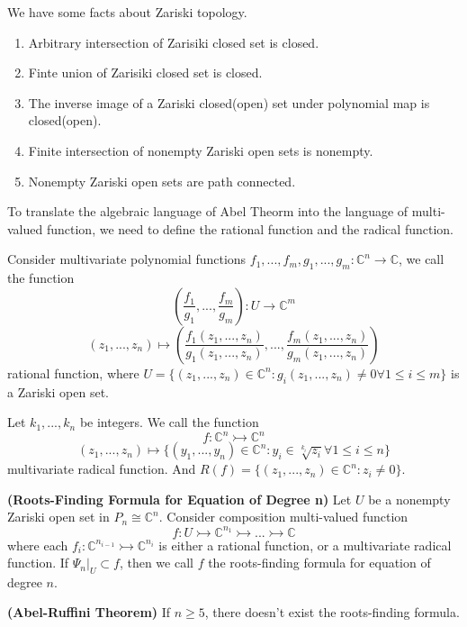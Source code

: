\documentclass[12pt]{article}
\newcommand{\C}{\mathbb{C}}
\newenvironment{definition}[2][Definition]{\begin{trivlist}
\item[\hskip \labelsep {\bfseries #1}\hskip \labelsep {\bfseries #2.}]}{\end{trivlist}}
\newenvironment{theorem}[2][Theorem]{\begin{trivlist}
\item[\hskip \labelsep {\bfseries #1}\hskip \labelsep {\bfseries #2.}]}{\end{trivlist}}
\newenvironment{proposition}[2][Proposition]{\begin{trivlist}
\item[\hskip \labelsep {\bfseries #1}\hskip \labelsep {\bfseries #2.}]}{\end{trivlist}}
\begin{document}
\begin{proposition}{5.2} We have some facts about Zariski topology.
    \begin{enumerate}
    \item Arbitrary intersection of Zarisiki closed set is closed.
    \item Finte union of Zarisiki closed set is closed.
    \item The inverse image of a Zariski closed(open) set under polynomial map is closed(open).
    \item Finite intersection of nonempty Zariski open sets is nonempty.
    \item Nonempty Zariski open sets are path connected.
\end{enumerate}
\end{proposition}
To translate the algebraic language of Abel Theorm into the language of multi-valued function, we need to define the rational function and the radical function.
\begin{definition}{5.3}
    Consider multivariate polynomial functions $f_1,...,f_m,g_1,...,g_m:\C^n\to\C$, we call the function 
    $$
    (\frac{f_1}{g_1},...,\frac{f_m}{g_m}):U\to \C^m
    $$
    $$
    (z_1,...,z_n)\mapsto (\frac{f_1(z_1,...,z_n)}{g_1(z_1,...,z_n)},...,\frac{f_m(z_1,...,z_n)}{g_m(z_1,...,z_n)})
    $$
    rational function, where $U=\{(z_1,...,z_n)\in \C^n:g_i(z_1,...,z_n)\neq 0 \forall 1\leq i\leq m\}$ is a Zariski open set.
\end{definition}
\begin{definition}{5.4}
    Let $k_1,...,k_n$ be integers. We call the function
    $$
    f:\C^n \rightarrowtail \C^n
    $$
    $$
    (z_1,...,z_n)\mapsto\{(y_1,...,y_n)\in \C^n:y_i \in \sqrt[k_i]{z_i}\forall 1\leq i\leq n\}
    $$
    multivariate radical function. And $R(f)=\{(z_1,...,z_n)\in \C^n:z_i\neq 0\}$.
\end{definition}
\begin{definition}{5,5}\textbf{(Roots-Finding Formula for Equation of Degree n)}
    Let $U$ be a nonempty Zariski open set in $P_n\cong \C^n$. Consider composition multi-valued function
    $$
    f:U\rightarrowtail \C^{n_1}\rightarrowtail...\rightarrowtail\C
    $$
    where each $f_i:\C^{n_{i-1}}\rightarrowtail \C^{n_{i}}$ is either a rational function, or a multivariate radical function. If $\Psi_n|_{U}\subset f$, then we call $f$ the roots-finding formula for equation of degree $n$.
\end{definition}
\begin{theorem}{5.6}\textbf{(Abel-Ruffini Theorem)}
    If $n\geq 5$, there doesn't exist the roots-finding formula.
\end{theorem}
\end{document}
